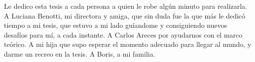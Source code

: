 
\vspace*{\fill}


Le dedico esta tesis a cada persona a quien le robe alg\'un minuto para realizarla. A Luciana Benotti, mi directora y amiga, que sin duda fue la que m\'as le dedic\'o tiempo a mi tesis, que estuvo a mi lado gu\'iandome y consiguiendo nuevos desaf\'ios para m\'i, a cada instante. A Carlos Areces por ayudarnos con el marco te\'orico. A mi hija que supo esperar el momento adecuado para llegar al mundo, y darme un recreo en la tesis. A Boris, a mi familia. 


\vspace{\fill}
